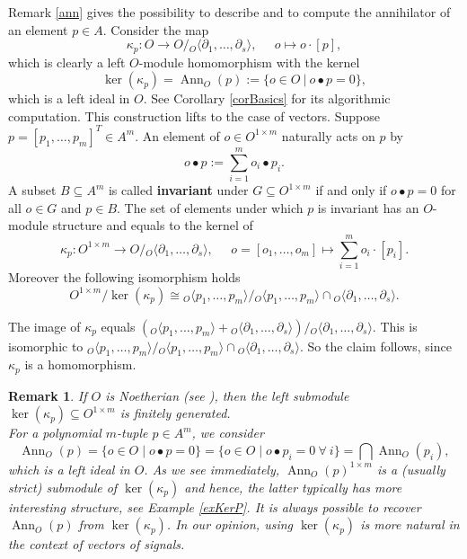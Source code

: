 \documentclass[a4paper,10pt]{article}
\newtheorem{remark}[Th]{Remark}
\theoremstyle{nonumberplain}
\DeclareMathOperator{\ann}{Ann}
\begin{document}
Remark \ref{ann} gives the possibility to describe and to compute the 
annihilator of an element $p \in A$. 
Consider the map
\begin{equation} \label{kappa_p}
\kappa_p : O \rightarrow O /  {}_O\langle\partial_1, \dots, \partial_s \rangle, 
\;\;\;\;\; o \mapsto o \cdot [p],
\end{equation}
which is clearly a left $O$-module homomorphism with the kernel
$$\ker(\kappa_p) = \ann_O(p):=\{ o \in O \ | \ o \bullet p=0  \}, $$ 
which is a left ideal in $O$. See Corollary \ref{corBasics} for its algorithmic computation.
This construction lifts to the case of vectors. Suppose 
$p= \left[ p_1, \dots, p_m \right]^{T}  \in A^m$. 
An element of $o \in O^{1 \times m}$ naturally acts on $p$ by 
$$o \bullet p := \sum_{i=1}^m o_i \bullet p_i .$$ 
A subset $B \subseteq A^m$ is called \textbf{invariant} under 
$G \subseteq O^{1 \times m}$ if and only if $o \bullet p = 0$ for all 
$o \in G$ and $p \in B$.
The set of elements under which $p$ is invariant has an $O$-module 
structure and equals to the kernel of 
$$
\kappa_p : O^{1 \times m} \rightarrow O /  {}_O \langle \partial_1, \dots, \partial_s \rangle, 
\;\;\;\;\; o=[o_1, \dots, o_m] \mapsto \sum_{i=1}^m o_i \cdot [p_i].
$$
Moreover the following isomorphism holds
$$O^{1\times m} / \ker(\kappa_p) \cong 
{}_{O}\langle p_1, \dots, p_m \rangle / {}_{O}\langle p_1, \dots, p_m \rangle \cap 
{}_{O}\langle \partial_1, \dots, \partial_s \rangle .$$


The image of $\kappa_p$ equals $( {}_{O} \langle p_1, \dots, p_m \rangle + {}_{O}\langle 
\partial_1, \dots, \partial_s \rangle )  /
{}_{O}\langle \partial_1, \dots, \partial_s \rangle.$ This is isomorphic to 
$ {}_{O}\langle p_1, \dots, p_m \rangle / 
{}_{O}\langle p_1, \dots, p_m \rangle \cap {}_{O}\langle \partial_1, \dots, \partial_s \rangle$. 
So the claim follows, since $\kappa_p$ is a homomorphism.

\begin{remark}\label{finitely}
If $O$ is Noetherian (see \cite{MR}), then the left submodule 
$\ker(\kappa_p) \subseteq O^{1 \times m}$ is finitely generated. \\

For a polynomial $m$-tuple $p\in A^m$, we consider 
\[
\ann_O (p) = \{ o\in O \mid o \bullet p = 0 \} = 
\{ o\in O \mid o \bullet p_i = 0 \ \forall \ i \} = 
\bigcap \ann_O (p_i),
\]
which is a left ideal in $O$. As we see immediately,
$\ann_O (p)^{1\times m}$ is a (usually strict) submodule
of $\ker(\kappa_p)$ and hence, the latter typically has 
more interesting structure, see Example \ref{exKerP}. It is
always possible to recover $\ann_O (p)$ from $\ker(\kappa_p)$.
In our opinion, using $\ker(\kappa_p)$ is more natural in the
context of vectors of signals.
\end{remark}
\end{document}

